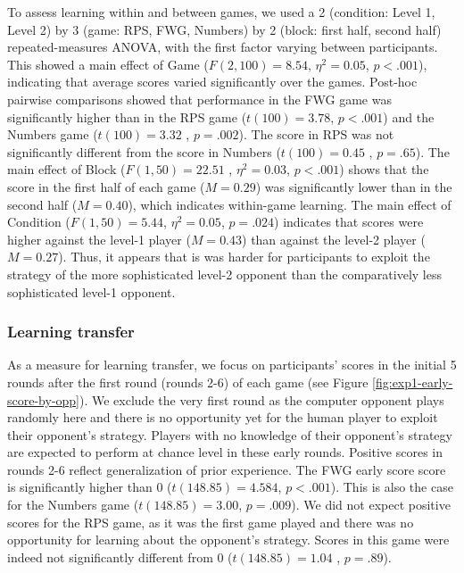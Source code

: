 \documentclass[man,floatsintext]{apa6}
\begin{document}
To assess learning within and between games, we used a 2 (condition: Level 1, Level 2) by 3 (game: RPS, FWG, Numbers) by 2 (block: first half, second half) repeated-measures ANOVA, with the first factor varying between participants. This showed a main effect of Game (\(F(2,100) = 8.54\), \(\eta^{2} = 0.05\), \(p < .001\)), indicating that average scores varied significantly over the games. Post-hoc pairwise comparisons showed that performance in the FWG game was significantly higher than in the RPS game (\(t(100) =3.78\), \(p < .001\)) and the Numbers game (\(t(100) = 3.32\) , \(p = .002\)). The score in RPS was not significantly different from the score in Numbers (\(t(100) = 0.45\) , \(p = .65\)). The main effect of Block (\(F(1,50) = 22.51\) , \(\eta^{2} = 0.03\), \(p < .001\)) shows that the score in the first half of each game (\(M = 0.29\)) was significantly lower than in the second half (\(M = 0.40\)), which indicates within-game learning. The main effect of Condition (\(F(1,50) = 5.44\), \(\eta^{2} = 0.05\), \(p = .024\)) indicates that scores were higher against the level-1 player (\(M = 0.43\)) than against the level-2 player (\(M = 0.27\)). Thus, it appears that is was harder for participants to exploit the strategy of the more sophisticated level-2 opponent than the comparatively less sophisticated level-1 opponent.

\hypertarget{learning-transfer}{%
\subsubsection{Learning transfer}\label{learning-transfer}}

As a measure for learning transfer, we focus on participants' scores in the initial 5 rounds after the first round (rounds 2-6) of each game (see Figure \ref{fig:exp1-early-score-by-opp}). We exclude the very first round as the computer opponent plays randomly here and there is no opportunity yet for the human player to exploit their opponent's strategy. Players with no knowledge of their opponent's strategy are expected to perform at chance level in these early rounds. Positive scores in rounds 2-6 reflect generalization of prior experience. The FWG early score score is significantly higher than 0 (\(t(148.85) = 4.584\), \(p < .001\)). This is also the case for the Numbers game (\(t(148.85) = 3.00\), \(p = .009\)). We did not expect positive scores for the RPS game, as it was the first game played and there was no opportunity for learning about the opponent's strategy. Scores in this game were indeed not significantly different from 0 (\(t(148.85) = 1.04\) , \(p = .89\)).
\end{document}
